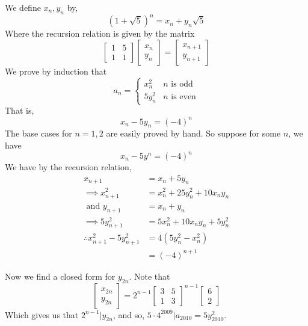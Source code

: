 \begin{solution}
    We define $x_n, y_n$ by,
    \[(1+\sqrt{5})^n = x_n + y_n \sqrt{5}\] 
    Where the recursion relation is given by the matrix
    \[\begin{bmatrix} 1 & 5 \\ 1 & 1 \end{bmatrix} \begin{bmatrix} x_n \\ y_n
    \end{bmatrix} = \begin{bmatrix} x_{n+1} \\ y_{n+1} \end{bmatrix}\] 
    We prove by induction that 
    \[a_n = \begin{cases}
        x_n^2 &  n \text{ is odd}\\
        5y_n^2 & n \text{ is even}
    \end{cases}\]
    That is, 
    \[x_n - 5y_n = (-4)^n\] 
    The base cases for $n=1, 2$ are easily proved by hand. So suppose for some
    $n$, we have
    \[x_n - 5y^n = (-4)^n\] 
    We have by the recursion relation, 
    \[\begin{aligned}
        x_{n+1} &= x_n + 5y_n\\
        \implies x_{n+1}^2 &= x_n^2 + 25y_n^2 + 10x_ny_n\\[1em]
        \text{ and } y_{n+1} &= x_n + y_n\\
        \implies 5y_{n+1}^2 &= 5x_n^2 + 10x_ny_n + 5y_n^2\\[1em]
        \therefore x_{n+1}^2 - 5y_{n+1}^2 &= 4(5y_n^2 - x_n^2)\\
                                          &= (-4)^{n+1}
    \end{aligned}\]

    Now we find a closed form for $y_{2n}$. Note that
    \[\begin{bmatrix} x_{2n}\\y_{2n} \end{bmatrix} = 2^{n-1}\begin{bmatrix} 3 & 5\\ 1
        & 3\end{bmatrix}^{n-1} \begin{bmatrix} 6\\2 \end{bmatrix} \] 
    Which gives us that $2^{n-1}| y_{2n}$, and so, $5\cdot 4^{2009}|a_{2010} =
    5y_{2010}^2$.\\


\end{solution}
